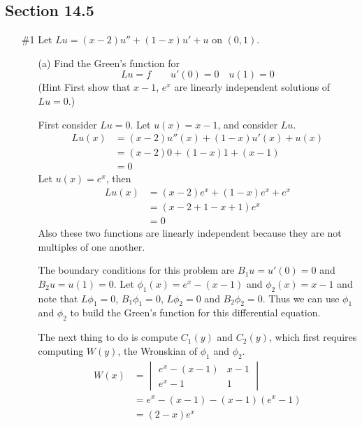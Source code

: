 \documentclass[11pt, oneside]{article}
\begin{document}
\subsection*{Section 14.5}
\begin{enumerate}
  \item[\#1] %
    Let $Lu = (x - 2)u'' + (1 - x)u' + u$ on $(0, 1)$.
    \begin{enumerate}
      \item[(a)] %
        Find the Green's function for
        \[
          Lu = f \qquad u'(0) = 0 \quad u(1) = 0
        \]
        (Hint First show that $x - 1$, $e^x$ are linearly independent
        solutions of $Lu = 0$.)

        First consider $Lu = 0$.
        Let $u(x) = x - 1$, and consider $Lu$.
        \begin{align*}
          Lu(x) &= (x - 2)u''(x) + (1 - x)u'(x) + u(x) \\
          &= (x - 2)0 + (1 - x)1 + (x - 1) \\
          &= 0
        \end{align*}
        Let $u(x) = e^x$, then
        \begin{align*}
          Lu(x) &= (x - 2)e^x + (1 - x)e^x + e^x \\
          &= (x - 2 + 1 - x + 1)e^x \\
          &= 0
        \end{align*}
        Also these two functions are linearly independent because they are not
        multiples of one another.

        The boundary conditions for this problem are $B_1 u = u'(0) = 0$ and
        $B_2 u = u(1) = 0$.
        Let $\phi_1(x) = e^x - (x - 1)$ and $\phi_2(x) = x - 1$ and note that
        $L\phi_1 = 0$, $B_1 \phi_1 = 0$, $L\phi_2 = 0$ and $B_2 \phi_2 = 0$.
        Thus we can use $\phi_1$ and $\phi_2$ to build the Green's function for
        this differential equation.

        The next thing to do is compute $C_1(y)$ and $C_2(y)$, which first
        requires computing $W(y)$, the Wronskian of $\phi_1$ and $\phi_2$.
        \begin{align*}
          W(x) &=
          \begin{vmatrix}
            e^x - (x - 1) & x - 1 \\
            e^x - 1 & 1
          \end{vmatrix} \\
          &= e^x - (x - 1) - (x - 1)(e^x - 1) \\
          &= (2 - x)e^x
        \end{align*}


\end{enumerate}
\end{enumerate}
\end{document}
